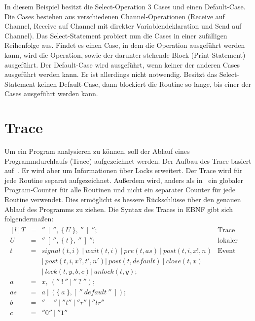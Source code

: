 In diesem Beispiel besitzt die Select-Operation 3 Cases und einen Default-Case.
Die Cases bestehen aus verschiedenen Channel-Operationen (Receive auf Channel, 
Receive auf Channel mit direkter Variablendeklaration und Send auf Channel).
Das Select-Statement probiert nun die Cases in einer zufälligen Reihenfolge 
aus. Findet es einen Case, in dem die Operation ausgeführt werden kann, wird 
die Operation, sowie der darunter stehende Block (Print-Statement) ausgeführt.
Der Default-Case wird ausgeführt, wenn keiner der anderen Cases ausgeführt 
werden kann. Er ist allerdings nicht notwendig. Besitzt das Select-Statement 
keinen Default-Case, dann blockiert die Routine so lange, bis einer der Cases 
ausgeführt werden kann.

\section{Trace}\label{chap:background-sec:trace}
Um ein Program analysieren zu können, soll der Ablauf eines Programmdurchlaufs
(Trace) aufgezeichnet werden. Der Aufbau des Trace basiert auf~\cite{PPDP18}. 
Er wird aber um Informationen 
über Locks erweitert. Der Trace wird für jede Routine
separat aufgezeichnet. Außerdem wird, anders als in~\cite{PPDP18} ein globaler
Program-Counter für alle Routinen und nicht ein separater Counter für jede 
Routine verwendet. Dies ermöglicht es bessere Rückschlüsse über den genauen 
Ablauf des Programms zu ziehen.
Die Syntax des Traces in EBNF gibt sich 
folgendermaßen:
\begin{align*}
  \begin{matrix*}[l]
    T & = & ''\ [\ '',\ \{\ U\ \},\ ''\ ]\ ''; & \text{Trace}\\
    U & = & ''\ [\ '',\ \{\ t\ \},\ ''\ ]\ ''; & \text{lokaler Trace} \\
    t & = & signal(t, i)\ |\ wait(t, i)\ |\ pre(t, as)\ |\ post(t, i, x!, n) & \text{Event}\\
      &   & |\ post(t, i, x?, t', n') |\ post(t, default)\ 
      |\ close(t, x)\  
      & \\
      &   & |\ lock(t, y, b, c) |\ unlock(t, y); & \\
    a & = & x,\ (''\ !\ ''\ |\ ''\ ?\ ''); & \\
    as & = & a\ |\ (\{\ a\ \}, [\ ''\ default\ ''\ ]); & \\
    b & = & ''-''\ |\ ''t''\ |\ ''r''\ |\ ''tr'' & \\
    c & = & ''0''\ |\ ''1''
  \end{matrix*}
\end{align*}

